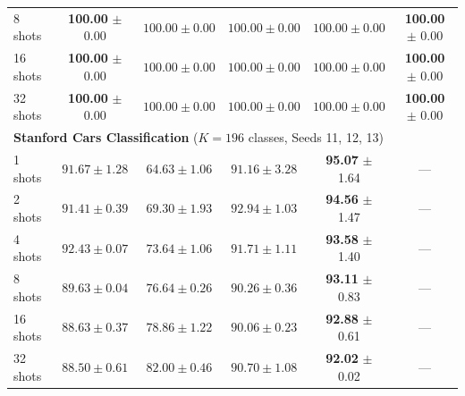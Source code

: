 \documentclass[letterpaper,11pt,leqno]{article}
\begin{document}
\begin{table}[H]
\begin{tabular*}{\textwidth}{@{\extracolsep{\fill}}lccccc}
 8 shots & \cellcolor{bestgreen}\textbf{100.00} $\pm$ 0.00 & $100.00 \pm 0.00$ & $100.00 \pm 0.00$ & $100.00 \pm 0.00$ & \cellcolor{bestgreen}\textbf{100.00} $\pm$ 0.00 \\
 16 shots & \cellcolor{bestgreen}\textbf{100.00} $\pm$ 0.00 & $100.00 \pm 0.00$ & $100.00 \pm 0.00$ & $100.00 \pm 0.00$ & \cellcolor{bestgreen}\textbf{100.00} $\pm$ 0.00 \\
 32 shots & \cellcolor{bestgreen}\textbf{100.00} $\pm$ 0.00 & $100.00 \pm 0.00$ & $100.00 \pm 0.00$ & $100.00 \pm 0.00$ & \cellcolor{bestgreen}\textbf{100.00} $\pm$ 0.00 \\
\midrule
\multicolumn{6}{l}{\textbf{Stanford Cars Classification} ($K=196$ classes, Seeds 11, 12, 13)} \\
\midrule
 1 shots & $91.67 \pm 1.28$ & $64.63 \pm 1.06$ & $91.16 \pm 3.28$ & \cellcolor{bestgreen}\textbf{95.07} $\pm$ 1.64 & --- \\
 2 shots & $91.41 \pm 0.39$ & $69.30 \pm 1.93$ & $92.94 \pm 1.03$ & \cellcolor{bestgreen}\textbf{94.56} $\pm$ 1.47 & --- \\
 4 shots & $92.43 \pm 0.07$ & $73.64 \pm 1.06$ & $91.71 \pm 1.11$ & \cellcolor{bestgreen}\textbf{93.58} $\pm$ 1.40 & --- \\
 8 shots & $89.63 \pm 0.04$ & $76.64 \pm 0.26$ & $90.26 \pm 0.36$ & \cellcolor{bestgreen}\textbf{93.11} $\pm$ 0.83 & --- \\
 16 shots & $88.63 \pm 0.37$ & $78.86 \pm 1.22$ & $90.06 \pm 0.23$ & \cellcolor{bestgreen}\textbf{92.88} $\pm$ 0.61 & --- \\
 32 shots & $88.50 \pm 0.61$ & $82.00 \pm 0.46$ & $90.70 \pm 1.08$ & \cellcolor{bestgreen}\textbf{92.02} $\pm$ 0.02 & --- \\
\bottomrule
\end{tabular*}
\end{table}
\end{document}
